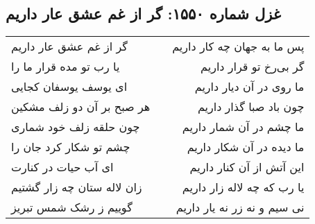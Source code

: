 \begin{center}
\section*{غزل شماره ۱۵۵۰: گر از غم عشق عار داریم}
\label{sec:1550}
\begin{longtable}{l p{0.5cm} r}
گر از غم عشق عار داریم
&&
پس ما به جهان چه کار داریم
\\
یا رب تو مده قرار ما را
&&
گر بی‌رخ تو قرار داریم
\\
ای یوسف یوسفان کجایی
&&
ما روی در آن دیار داریم
\\
هر صبح بر آن دو زلف مشکین
&&
چون باد صبا گذار داریم
\\
چون حلقه زلف خود شماری
&&
ما چشم در آن شمار داریم
\\
چشم تو شکار کرد جان را
&&
ما دیده در آن شکار داریم
\\
ای آب حیات در کنارت
&&
این آتش از آن کنار داریم
\\
زان لاله ستان چه زار گشتیم
&&
یا رب که چه لاله زار داریم
\\
گوییم ز رشک شمس تبریز
&&
نی سیم و نه زر نه یار داریم
\\
\end{longtable}
\end{center}
